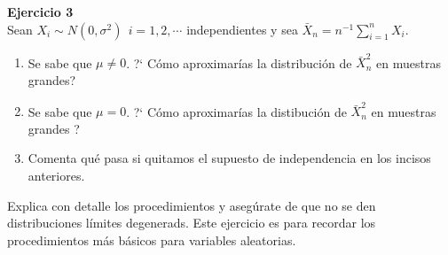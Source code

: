 \documentclass[a4paper, 11pt]{article}
\newenvironment{problem}[2][Ejercicio]
{ \begin{mdframed}[backgroundcolor= red!50] \textbf{#1 #2} \\}
	{  \end{mdframed}}
\begin{document}
\begin{problem}{3}
    Sean $X_i \sim N(0, \sigma^2) \: \: i = 1,2,\cdots$ independientes y sea $\bar{X}_n = n^{-1} \sum _{i=1}^n X_i .$
    \begin{enumerate}
        \item Se sabe que $\mu \neq 0$. ?` Cómo aproximarías la distribución de $\bar{X}_n^2 $ en muestras grandes? 
        \item Se sabe que $\mu = 0$. ?` Cómo aproximarías la distibución de $\bar{X}_n^2$ en muestras grandes ?
        \item Comenta qué pasa si quitamos el supuesto de independencia en los incisos anteriores. 
    \end{enumerate} 
    Explica con detalle los procedimientos y asegúrate de que no se den distribuciones límites degenerads. Este ejercicio es para recordar los procedimientos más básicos para variables aleatorias.
\end{problem}
\end{document}
